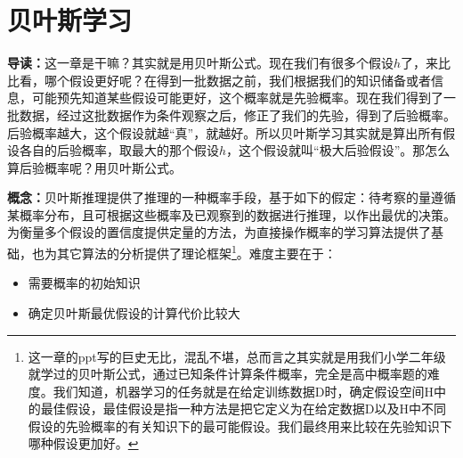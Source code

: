 \documentclass[../main.tex]{subfiles}
\begin{document}
\section{贝叶斯学习}\label{sec:bayesian-learning}
\textbf{导读：}这一章是干嘛？其实就是用贝叶斯公式。现在我们有很多个假设$h$了，来比比看，哪个假设更好呢？在得到一批数据之前，我们根据我们的知识储备或者信息，可能预先知道某些假设可能更好，这个概率就是先验概率。现在我们得到了一批数据，经过这批数据作为条件观察之后，修正了我们的先验，得到了后验概率。后验概率越大，这个假设就越“真”，就越好。所以贝叶斯学习其实就是算出所有假设各自的后验概率，取最大的那个假设$h$，这个假设就叫“极大后验假设”。那怎么算后验概率呢？用贝叶斯公式。

\textbf{概念：}贝叶斯推理提供了推理的一种概率手段，基于如下的假定：待考察的量遵循某概率分布，且可根据这些概率及已观察到的数据进行推理，以作出最优的决策。为衡量多个假设的置信度提供定量的方法，为直接操作概率的学习算法提供了基础，也为其它算法的分析提供了理论框架\footnote{这一章的ppt写的巨史无比，混乱不堪，总而言之其实就是用我们小学二年级就学过的贝叶斯公式，通过已知条件计算条件概率，完全是高中概率题的难度。我们知道，机器学习的任务就是在给定训练数据D时，确定假设空间H中的最佳假设，最佳假设是指一种方法是把它定义为在给定数据D以及H中不同假设的先验概率的有关知识下的最可能假设。我们最终用来比较在先验知识下哪种假设更加好。}。难度主要在于：
\begin{itemize}
    \item 需要概率的初始知识
    \item 确定贝叶斯最优假设的计算代价比较大
\end{itemize}
\end{document}
